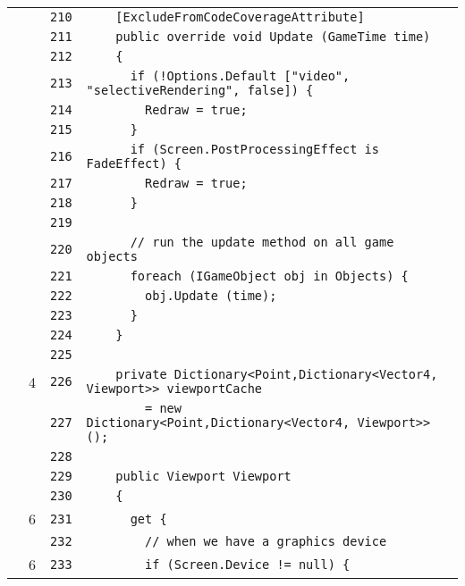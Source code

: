 \documentclass[a4paper,10pt]{article}
\begin{document}
\begin{longtable}[l]{lrrl}
\cellcolor{gray} &  & \verb~210~ & \verb~    [ExcludeFromCodeCoverageAttribute]~\\
\cellcolor{gray} &  & \verb~211~ & \verb~    public override void Update (GameTime time)~\\
\cellcolor{gray} &  & \verb~212~ & \verb~    {~\\
\cellcolor{gray} &  & \verb~213~ & \verb~      if (!Options.Default ["video", "selectiveRendering", false]) {~\\
\cellcolor{gray} &  & \verb~214~ & \verb~        Redraw = true;~\\
\cellcolor{gray} &  & \verb~215~ & \verb~      }~\\
\cellcolor{gray} &  & \verb~216~ & \verb~      if (Screen.PostProcessingEffect is FadeEffect) {~\\
\cellcolor{gray} &  & \verb~217~ & \verb~        Redraw = true;~\\
\cellcolor{gray} &  & \verb~218~ & \verb~      }~\\
\cellcolor{gray} &  & \verb~219~ & \verb~~\\
\cellcolor{gray} &  & \verb~220~ & \verb~      // run the update method on all game objects~\\
\cellcolor{gray} &  & \verb~221~ & \verb~      foreach (IGameObject obj in Objects) {~\\
\cellcolor{gray} &  & \verb~222~ & \verb~        obj.Update (time);~\\
\cellcolor{gray} &  & \verb~223~ & \verb~      }~\\
\cellcolor{gray} &  & \verb~224~ & \verb~    }~\\
\cellcolor{gray} &  & \verb~225~ & \verb~~\\
\cellcolor{green} & 4 & \verb~226~ & \verb~    private Dictionary<Point,Dictionary<Vector4, Viewport>> viewportCache~\\
\cellcolor{gray} &  & \verb~227~ & \verb~        = new Dictionary<Point,Dictionary<Vector4, Viewport>> ();~\\
\cellcolor{gray} &  & \verb~228~ & \verb~~\\
\cellcolor{gray} &  & \verb~229~ & \verb~    public Viewport Viewport~\\
\cellcolor{gray} &  & \verb~230~ & \verb~    {~\\
\cellcolor{green} & 6 & \verb~231~ & \verb~      get {~\\
\cellcolor{gray} &  & \verb~232~ & \verb~        // when we have a graphics device~\\
\cellcolor{green} & 6 & \verb~233~ & \verb~        if (Screen.Device != null) {~\\

\end{longtable}
\end{document}

